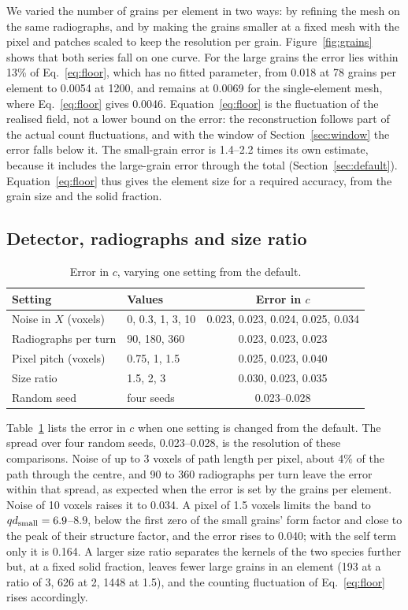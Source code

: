\documentclass[11pt]{article}
\begin{document}
We varied the number of grains per element in two ways: by refining the
mesh on the same radiographs, and by making the grains smaller at a fixed
mesh with the pixel and patches scaled to keep the resolution per grain.
Figure~\ref{fig:grains} shows that both series fall on one curve. For the
large grains the error lies within 13\% of Eq.~\eqref{eq:floor}, which has
no fitted parameter, from 0.018 at 78 grains per element to 0.0054 at 1200,
and remains at 0.0069 for the single-element mesh, where Eq.~\eqref{eq:floor}
gives 0.0046. Equation~\eqref{eq:floor} is the fluctuation of the realised
field, not a lower bound on the error: the reconstruction follows part of
the actual count fluctuations, and with the window of
Section~\ref{sec:window} the error falls below it. The small-grain error is 1.4--2.2 times its own estimate, because
it includes the large-grain error through the total
(Section~\ref{sec:default}). Equation~\eqref{eq:floor} thus gives the element
size for a required accuracy, from the grain size and the solid fraction.

\subsection{Detector, radiographs and size ratio}

\begin{table}
\centering
\caption{Error in $c$, varying one setting from the default.}
\label{tab:sensitivity}
\begin{tabular}{llc}
\toprule
Setting & Values & Error in $c$ \\
\midrule
Noise in $X$ (voxels) & 0, 0.3, 1, 3, 10 & 0.023, 0.023, 0.024, 0.025, 0.034 \\
Radiographs per turn & 90, 180, 360 & 0.023, 0.023, 0.023 \\
Pixel pitch (voxels) & 0.75, 1, 1.5 & 0.025, 0.023, 0.040 \\
Size ratio & 1.5, 2, 3 & 0.030, 0.023, 0.035 \\
Random seed & four seeds & 0.023--0.028 \\
\bottomrule
\end{tabular}
\end{table}

Table~\ref{tab:sensitivity} lists the error in $c$ when one setting is
changed from the default. The spread over four random seeds, 0.023--0.028,
is the resolution of these comparisons. Noise of up to 3 voxels of path
length per pixel, about 4\% of the path through the centre, and 90 to 360
radiographs per turn leave the error within that spread, as expected when
the error is set by the grains per element. Noise of 10 voxels raises it to
0.034. A pixel of 1.5 voxels limits the band to $qd_{\rm small}=6.9$--$8.9$,
below the first zero of the small grains' form factor and close to the peak
of their structure factor, and the error rises to 0.040; with the self term
only it is 0.164. A larger size ratio separates the kernels of the two
species further but, at a fixed solid fraction, leaves fewer large grains
in an element (193 at a ratio of 3, 626 at 2, 1448 at 1.5), and the counting
fluctuation of Eq.~\eqref{eq:floor} rises accordingly.
\end{document}
